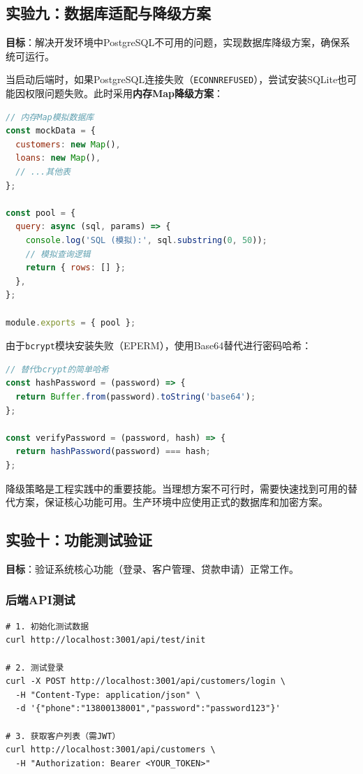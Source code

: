 \subsection{实验九：数据库适配与降级方案}

\textbf{目标}：解决开发环境中PostgreSQL不可用的问题，实现数据库降级方案，确保系统可运行。

当启动后端时，如果PostgreSQL连接失败（\texttt{ECONNREFUSED}），尝试安装SQLite也可能因权限问题失败。此时采用\textbf{内存Map降级方案}：

\begin{lstlisting}[language=JavaScript]
// 内存Map模拟数据库
const mockData = {
  customers: new Map(),
  loans: new Map(),
  // ...其他表
};

const pool = {
  query: async (sql, params) => {
    console.log('SQL (模拟):', sql.substring(0, 50));
    // 模拟查询逻辑
    return { rows: [] };
  },
};

module.exports = { pool };
\end{lstlisting}

由于\texttt{bcrypt}模块安装失败（EPERM），使用Base64替代进行密码哈希：

\begin{lstlisting}[language=JavaScript]
// 替代bcrypt的简单哈希
const hashPassword = (password) => {
  return Buffer.from(password).toString('base64');
};

const verifyPassword = (password, hash) => {
  return hashPassword(password) === hash;
};
\end{lstlisting}

\begin{warningbox}[教学要点]
降级策略是工程实践中的重要技能。当理想方案不可行时，需要快速找到可用的替代方案，保证核心功能可用。生产环境中应使用正式的数据库和加密方案。
\end{warningbox}

\subsection{实验十：功能测试验证}

\textbf{目标}：验证系统核心功能（登录、客户管理、贷款申请）正常工作。

\subsubsection*{后端API测试}

\begin{lstlisting}[style=shell]
# 1. 初始化测试数据
curl http://localhost:3001/api/test/init

# 2. 测试登录
curl -X POST http://localhost:3001/api/customers/login \
  -H "Content-Type: application/json" \
  -d '{"phone":"13800138001","password":"password123"}'

# 3. 获取客户列表（需JWT）
curl http://localhost:3001/api/customers \
  -H "Authorization: Bearer <YOUR_TOKEN>"
\end{lstlisting}


